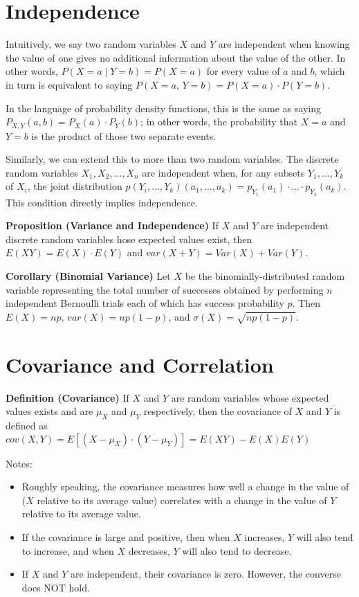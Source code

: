 \section{Independence}

Intuitively, we say two random variables $X$ and $Y$ are independent when knowing the value of one gives no additional information about the value of the other. In other words, $P(X = a \mid Y = b) = P(X = a)$ for every value of $a$ and $b$, which in turn is equivalent to saying $P(X = a, \, Y = b) = P(X = a) \cdot P(Y = b)$.

In the language of probability density functions, this is the same as saying $P_{X, Y}(a,b) = P_X(a) \cdot P_Y(b)$; in other words, the probability that $X = a$ and $Y = b$ is the product of those two separate events.

Similarly, we can extend this to more than two random variables. The discrete random variables $X_1, X_2, \ldots, X_n$ are independent when, for any subsets $Y_1, \ldots, Y_k$ of $X_i$, the joint distribution $p(Y_i, \ldots, Y_k) (a_1, \ldots, a_k) = p_{Y_1}(a_1) \cdot \ldots \cdot p_{Y_k}(a_k)$. This condition directly implies independence.

\textbf{Proposition (Variance and Independence)} If $X$ and $Y$ are independent discrete random variables hose expected values exist, then $E(XY) = E(X) \cdot E(Y)$ and $var(X + Y) = Var(X) + Var(Y)$.

\textbf{Corollary (Binomial Variance)} Let $X$ be the binomially-distributed random variable representing the total number of successes obtained by performing $n$ independent Bernoulli trials each of which has success probability $p$. Then $E(X) = np$, $var(X) = np(1 - p)$, and $\sigma(X) = \sqrt{np(1 - p)}$.

\section{Covariance and Correlation}

\textbf{Definition (Covariance)} If $X$ and $Y$ are random variables whose expected values exists and are $\mu_X$ and $\mu_Y$ respectively, then the covariance of $X$ and $Y$ is defined as $cov(X, Y) = E[(X - \mu_X) \cdot (Y - \mu_Y)] = E(XY) - E(X)E(Y)$

Notes: \begin{itemize}
    \item Roughly speaking, the covariance measures how well a change in the value of ($X$ relative to its average value) correlates with a change in the value of $Y$ relative to its average value.
    \item If the covariance is large and positive, then when $X$ increases, $Y$ will also tend to increase, and when $X$ decreases, $Y$ will also tend to decrease.
    \item If $X$ and $Y$ are independent, their covariance is zero. However, the converse does NOT hold.
\end{itemize}

